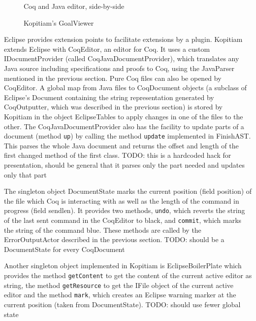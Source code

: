 \documentclass{article}
\begin{document}
\begin{figure}
\centering
{}
\caption{Coq and Java editor, side-by-side}
\label{fig:coqjava}
\end{figure}

\begin{figure}
\centering
{}
\caption{Kopitiam's GoalViewer}
\label{fig:goal}
\end{figure}


Eclipse provides extension points to facilitate extensions by a plugin. Kopitiam extends Eclipse with CoqEditor, an editor for Coq. It uses a custom IDocumentProvider (called CoqJavaDocumentProvider), which translates any Java source including specifications and proofs to Coq, using the JavaParser mentioned in the previous section. Pure Coq files can also be opened by CoqEditor. A global map from Java files to CoqDocument objects (a subclass of Eclipse's Document containing the string representation generated by CoqOutputter, which was described in the previous section) is stored by Kopitiam in the object EclipseTables to apply changes in one of the files to the other. The CoqJavaDocumentProvider also has the facility to update parts of a document (method \texttt{up}) by calling the method \texttt{update} implemented in FinishAST. This parses the whole Java document and returns the offset and length of the first changed method of the first class. TODO: this is a hardcoded hack for presentation, should be general that it parses only the part needed and updates only that part

The singleton object DocumentState marks the current position (field position) of the file which Coq is interacting with as well as the length of the command in progress (field sendlen). It provides two methods, \texttt{undo}, which reverts the string of the last sent command in the CoqEditor to black, and \texttt{commit}, which marks the string of the command blue. These methods are called by the ErrorOutputActor described in the previous section. TODO: should be a DocumentState for every CoqDocument

Another singleton object implemented in Kopitiam is EclipseBoilerPlate which provides the method \texttt{getContent} to get the content of the current active editor as string, the method \texttt{getResource} to get the IFile object of the current active editor and the method \texttt{mark}, which creates an Eclipse warning marker at the current position (taken from DocumentState). TODO: should use fewer global state
\end{document}
